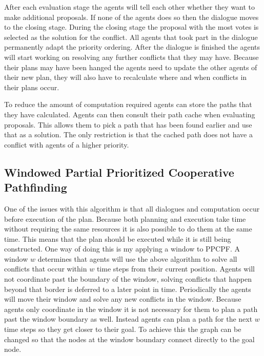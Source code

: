 After each evaluation stage the agents will tell each other whether they want
to make additional proposals. If none of the agents does so then the dialogue
moves to the closing stage. During the closing stage the proposal with the most
votes is selected as the solution for the conflict. All agents that took part
in the dialogue permanently adapt the priority ordering. After the dialogue is
finished the agents will start working on resolving any further conflicts that
they may have. Because their plans may have been hanged the agents need to
update the other agents of their new plan, they will also have to recalculate
where and when conflicts in their plans occur.

To reduce the amount of computation required agents can store the paths that
they have calculated. Agents can then consult their path cache when evaluating
proposals. This allows them to pick a path that has been found earlier and use
that as a solution. The only restriction is that the cached path does not have
a conflict with agents of a higher priority.

\subsection{Windowed Partial Prioritized Cooperative Pathfinding}
One of the issues with this algorithm is that all dialogues and computation
occur before execution of the plan. Because both planning and execution take
time without requiring the same resources it is also possible to do them at the
same time. This means that the plan should be executed while it is still being
constructed. One way of doing this is my applying a window to PPCPF. A
window $w$ determines that agents will use the above algorithm to solve all
conflicts that occur within $w$ time steps from their current position. Agents
will not coordinate past the boundary of the window, solving conflicts that
happen beyond that border is deferred to a later point in time. Periodically
the agents will move their window and solve any new conflicts in the window.
Because agents only coordinate in the window it is not necessary for them to
plan a path past the window boundary as well. Instead agents can plan a path
for the next $w$ time steps so they get closer to their goal. To achieve this
the graph can be changed so that the nodes at the window boundary connect
directly to the goal node.

